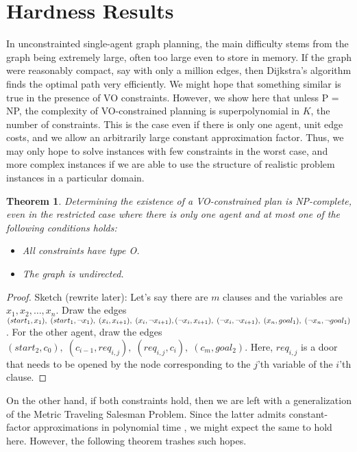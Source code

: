 \documentclass[letterpaper]{article}
\newtheorem{thm}{Theorem}
\begin{document}
\section{Hardness Results}

In unconstrainted single-agent graph planning, the main difficulty stems from the graph being extremely large, often too large even to store in memory. If the graph were reasonably compact, say with only a million edges, then Dijkstra's algorithm finds the optimal path very efficiently. We might hope that something similar is true in the presence of VO constraints. However, we show here that unless P = NP, the complexity of VO-constrained planning is superpolynomial in $K$, the number of constraints. This is the case even if there is only one agent, unit edge costs, and we allow an arbitrarily large constant approximation factor. Thus, we may only hope to solve instances with few constraints in the worst case, and more complex instances if we are able to use the structure of realistic problem instances in a particular domain.

\begin{thm}
Determining the existence of a VO-constrained plan is NP-complete, even in the restricted case where there is only one agent and at most one of the following conditions holds:
\begin{itemize}
\item All constraints have type O.
\item The graph is undirected.
\end{itemize}
\end{thm}

\begin{proof}
Sketch (rewrite later):
Let's say there are $m$ clauses and the variables are $x_1,x_2,\ldots,x_n$. Draw the edges $(start_1,x_1),\;(start_1,\neg x_1),\;(x_i,x_{i+1}),\;(x_i,\neg x_{i+1}),\;\\(\neg x_i,x_{i+1}),\;(\neg x_i,\neg x_{i+1}),\;(x_n,goal_1),\;(\neg x_n,\neg goal_1)$. For the other agent, draw the edges $(start_2,c_0),\;(c_{i-1},req_{i,j}),\;(req_{i,j},c_i),\;(c_m,goal_2)$. Here, $req_{i,j}$ is a door that needs to be opened by the node corresponding to the $j$'th variable of the $i$'th clause.
\end{proof}

On the other hand, if both constraints hold, then we are left with a generalization of the Metric Traveling Salesman Problem. Since the latter admits constant-factor approximations in polynomial time \cite{christofides1976worst}, we might expect the same to hold here. However, the following theorem trashes such hopes.
\end{document}
